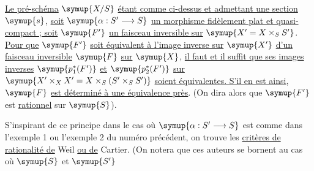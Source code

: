 \uline{Le pré-schéma} $\symup{X/S}$ \uline{étant comme ci-dessus et admettant une section} $\symup{s}$,
\uline{soit} $\symup{\alpha:S'\longrightarrow S}$ \uline{un morphisme fidèlement plat et
quasi-compact ; soit} $\symup{F'}$ \uline{un faisceau inversible sur} $\symup{X'=X\times_SS'}$. \uline{Pour que}
$\symup{F'}$ \uline{soit équivalent à l'image inverse sur} $\symup{X'}$ \uline{d'un faisceau inversible} $\symup{F}$
\uline{sur} $\symup{X}$, \uline{il faut et il suffit que ses images inverses} $\symup{p_1^*(F')}$ \uline{et} $\symup{p_2^*(F')}$
\uline{sur} $\symup{X'\times_XX'=X\times_S(S'\times_SS')}$ \uline{soient équivalentes. S'il en est
ainsi}, $\symup{F}$ \uline{est déterminé à une équivalence près}. (On dira alors que $\symup{F'}$ est
\uline{rationnel} sur $\symup{S}$).

S'inspirant de ce principe dans le cas où
$\symup{\alpha:S'\longrightarrow S}$ est comme dans l'exemple 1 ou l'exemple 2 du
numéro précédent, on trouve les \uline{critères de rationalité de} Weil \uline{ou de} Cartier.
(On notera que ces auteurs se bornent au cas où $\symup{S}$ et $\symup{S'}$

